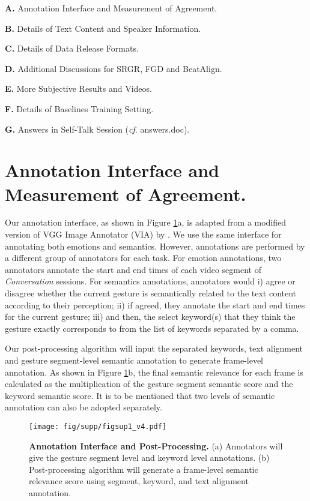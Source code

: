 \documentclass[runningheads]{llncs}
\begin{document}
\textbf{A.} Annotation Interface and Measurement of Agreement.

\textbf{B.} Details of Text Content and Speaker Information.

\textbf{C.} Details of Data Release Formats. 

\textbf{D.} Additional Discussions for SRGR, FGD and
BeatAlign. 

\textbf{E.} More Subjective Results and Videos. 

\textbf{F.} Details of Baselines Training Setting. 

\textbf{G.} Answers in Self-Talk Session (\textit{cf}. answers.doc). 



\section{Annotation Interface and Measurement of Agreement.}
Our annotation interface, as shown in Figure \ref{fig:spfig1}a, is adapted from a modified version of VGG Image Annotator (VIA) \cite{dutta2019vgg} by \cite{punnakkal2021babel}. We use the same interface for annotating both emotions and semantics. However, annotations are performed by a different group of annotators for each task. For emotion annotations, two annotators annotate the start and end times of each video segment of \textit{Conversation} sessions. For semantics annotations, annotators would i) agree or disagree whether the current gesture is semantically related to the text content according to their perception; ii) if agreed, they annotate the start and end times for the current gesture; iii) and then, the select keyword(s) that they think the gesture exactly corresponds to from the list of keywords separated by a comma.  

Our post-processing algorithm will input the separated keywords, text alignment and gesture segment-level semantic annotation to generate frame-level annotation. As shown in Figure \ref{fig:spfig1}b, the final semantic relevance for each frame is calculated as the multiplication of the gesture segment semantic score and the keyword semantic score. It is to be mentioned that two levels of semantic annotation can also be adopted separately.

\begin{figure}[h]
    \centering
    \texttt{[image: fig/supp/figsup1\_v4.pdf]}
    \caption{\textbf{Annotation Interface and Post-Processing.} (a) Annotators will give the gesture segment level and keyword level annotations. (b) Post-processing algorithm will generate a frame-level semantic relevance score using segment, keyword, and text alignment annotation.  }
    \label{fig:spfig1}
\end{figure}
\end{document}
